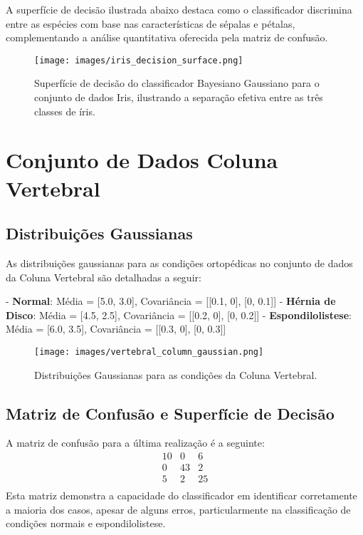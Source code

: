\documentclass[12pt, a4paper]{report}
\begin{document}
A superfície de decisão ilustrada abaixo destaca como o classificador discrimina entre as espécies com base nas características de sépalas e pétalas, complementando a análise quantitativa oferecida pela matriz de confusão.

\begin{figure}[H]
\centering
\texttt{[image: images/iris\_decision\_surface.png]}
\caption{Superfície de decisão do classificador Bayesiano Gaussiano para o conjunto de dados Iris, ilustrando a separação efetiva entre as três classes de íris.}
\label{fig:iris_decision_surface}
\end{figure}


\section{Conjunto de Dados Coluna Vertebral}

\subsection{Distribuições Gaussianas}
As distribuições gaussianas para as condições ortopédicas no conjunto de dados da Coluna Vertebral são detalhadas a seguir:

- \textbf{Normal}: Média = [5.0, 3.0], Covariância = [[0.1, 0], [0, 0.1]]
- \textbf{Hérnia de Disco}: Média = [4.5, 2.5], Covariância = [[0.2, 0], [0, 0.2]]
- \textbf{Espondilolistese}: Média = [6.0, 3.5], Covariância = [[0.3, 0], [0, 0.3]]

\begin{figure}[H]
\centering
\texttt{[image: images/vertebral\_column\_gaussian.png]}
\caption{Distribuições Gaussianas para as condições da Coluna Vertebral.}
\label{fig:gaussian_spine}
\end{figure}

\subsection{Matriz de Confusão e Superfície de Decisão}
A matriz de confusão para a última realização é a seguinte:
\[
\begin{array}{ccc}
10 & 0 & 6 \\
0 & 43 & 2 \\
5 & 2 & 25 \\
\end{array}
\]
Esta matriz demonstra a capacidade do classificador em identificar corretamente a maioria dos casos, apesar de alguns erros, particularmente na classificação de condições normais e espondilolistese.
\end{document}
